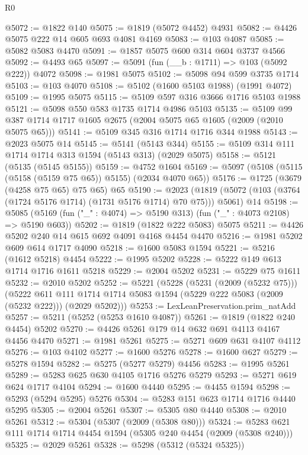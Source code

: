 \begin{lexlean}{R0}
\begin{coremodule}
@5072 := @1822 @140
@5075 := @1819 (@5072 @4452) @4931
@5082 := @4426 @5075 @222 @14 @605 @693 @4081 @4169
@5083 := @103 @4087
@5085 := @5082 @5083 @4470
@5091 := @1857 @5075 @600 @314 @604 @3737 @4566
@5092 := @4493 @65
@5097 := @5091 (fun (__b : @1711) => @103 (@5092 @222)) @4072
@5098 := @1981 @5075
@5102 := @5098 @94 @599 @3735 @1714
@5103 := @103 @4070
@5108 := @5102 (@1600 @5103 @1988) (@1991 @4072)
@5109 := @1995 @5075
@5115 := @5109 @597 @316 @3666 @1716 @5103 @1988
@5121 := @5098 @550 @583 @1735 @1714 @4986 @5103
@5135 := @5109 @99 @387 @1714 @1717 @1605 @2675 (@2004 @5075 @65 @1605 (@2009 (@2010 @5075 @65)))
@5141 := @5109 @345 @316 @1714 @1716 @344 @1988
@5143 := @2023 @5075 @14
@5145 := @5141 (@5143 @344)
@5155 := @5109 @314 @111 @1714 @1714 @313 @1594 (@5143 @313) (@2029 @5075)
@5158 := @5121 (@5135 (@5145 @5155))
@5159 := @4752 @1604
@5169 := @5097 (@5108 (@5115 (@5158 (@5159 @75 @65)) @5155) (@2034 @4070 @65))
@5176 := @1725 (@3679 (@4258 @75 @65) @75 @65) @65
@5190 := @2023
    (@1819 (@5072 (@103 (@3764 (@1724 @5176 @1714) (@1731 @5176 @1714) @70 @75))) @5061)
    @14
@5198 := @5085 (@5169 (fun ("_" : @4074) => @5190 @313) (fun ("_" : @4073 @2108) => @5190 @603))
@5202 := @1819 (@1822 @222 @5083) @5075
@5211 := @4426 @5202 @240 @14 @615 @692 @4091 @4168 @4454 @4470
@5216 := @1981 @5202 @609 @614 @1717 @4090
@5218 := @1600 @5083 @1594
@5221 := @5216 (@1612 @5218) @4454
@5222 := @1995 @5202
@5228 := @5222 @149 @613 @1714 @1716 @1611 @5218
@5229 := @2004 @5202
@5231 := @5229 @75 @1611
@5232 := @2010 @5202
@5252 := @5221
    (@5228
      (@5231 (@2009 (@5232 @75)))
      (@5222
        @611
        @111
        @1714
        @1714
        @5083
        @1594
        (@5229 @222 @5083 (@2009 (@5232 @222)))
        (@2029 @5202)))
@5253 := LexLeanPreservation.prim_natAdd
@5257 := @5211 (@5252 (@5253 @1610 @4087))
@5261 := @1819 (@1822 @240 @4454) @5202
@5270 := @4426 @5261 @179 @14 @632 @691 @4113 @4167 @4456 @4470
@5271 := @1981 @5261
@5275 := @5271 @609 @631 @4107 @4112
@5276 := @103 @4102
@5277 := @1600 @5276
@5278 := @1600 @627
@5279 := @5278 @1594
@5282 := @5275 (@5277 @5279) @4456
@5283 := @1995 @5261
@5289 := @5283 @625 @630 @4105 @1716 @5276 @5279
@5293 := @5271 @619 @624 @1717 @4104
@5294 := @1600 @4440
@5295 := @4455 @1594
@5298 := @5293 (@5294 @5295) @5276
@5304 := @5283 @151 @623 @1714 @1716 @4440 @5295
@5305 := @2004 @5261
@5307 := @5305 @80 @4440
@5308 := @2010 @5261
@5312 := @5304 (@5307 (@2009 (@5308 @80)))
@5324 := @5283 @621 @111 @1714 @1714 @4454 @1594 (@5305 @240 @4454 (@2009 (@5308 @240)))
@5325 := @2029 @5261
@5328 := @5298 (@5312 (@5324 @5325))

\end{coremodule}
\end{lexlean}
